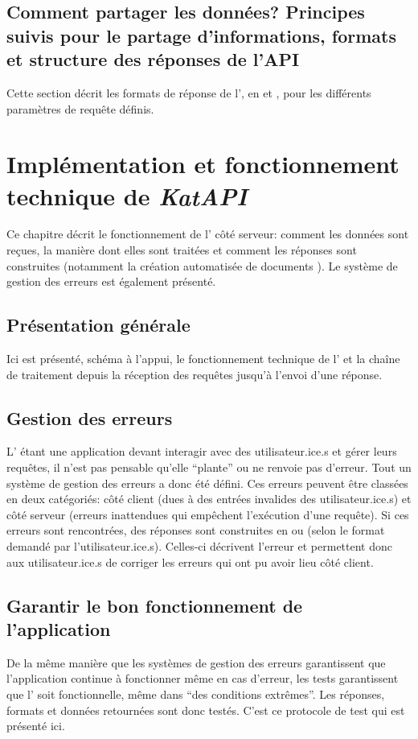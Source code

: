 \section{Comment partager les données? Principes suivis pour le partage d'informations, formats et structure des réponses de l'API}
Cette section décrit les formats de réponse de l'\api{}, en \json{} et \xmltei{}, pour les différents paramètres de requête définis.

\chapter{Implémentation et fonctionnement technique de \textit{KatAPI}}
Ce chapitre décrit le fonctionnement de l'\api{} côté serveur: comment les données sont reçues, la manière dont elles sont traitées et comment les réponses sont construites (notamment la création automatisée de documents \xmltei{}). Le système de gestion des erreurs est également présenté.

\section{Présentation générale}
Ici est présenté, schéma à l'appui, le fonctionnement technique de l'\api{} et la chaîne de traitement depuis la réception des requêtes jusqu'à l'envoi d'une réponse.

\section{Gestion des erreurs}
L'\api{} étant une application devant interagir avec des utilisateur.ice.s et gérer leurs requêtes, il n'est pas pensable qu'elle \enquote{plante} ou ne renvoie pas d'erreur. Tout un système de gestion des erreurs a donc été défini. Ces erreurs peuvent être classées en deux catégoriés: côté client (dues à des entrées invalides des utilisateur.ice.s)  et côté serveur (erreurs inattendues qui empêchent l'exécution d'une requête). Si ces erreurs sont rencontrées, des réponses sont construites en \json{} ou \xmltei{} (selon le format demandé par l'utilisateur.ice.s). Celles-ci décrivent l'erreur et permettent donc aux utilisateur.ice.s de corriger les erreurs qui ont pu avoir lieu côté client.

\section{Garantir le bon fonctionnement de l'application}
De la même manière que les systèmes de gestion des erreurs garantissent que l'application continue à fonctionner même en cas d'erreur, les tests garantissent que l'\api{} soit fonctionnelle, même dans \enquote{des conditions extrêmes}. Les réponses, formats et données retournées sont donc testés. C'est ce protocole de test qui est présenté ici.